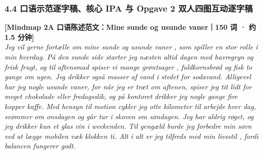 \subsubsection*{4.4 口语示范逐字稿、核心 IPA 与 Opgave 2 双人四图互动逐字稿}

\begin{transbox}
\small
\textbf{\color{NCDNavy}[Mindmap 2A 口语陈述范文：Mine sunde og usunde vaner｜150 词 · 约 1.5 分钟]}\\
\textit{Jeg vil gerne fortælle om mine sunde og usunde vaner , som spiller en stor rolle i min hverdag. På den sunde side starter jeg næsten altid dagen med havregryn  og frisk frugt, og til aftensmad spiser vi mange grøntsager , fuldkornsbrød og fisk to gange om ugen. Jeg drikker også masser af vand i stedet for sodavand. Alligevel har jeg nogle usunde vaner, for når jeg er træt om aftenen, spiser jeg tit lidt for meget chokolade  eller fredagsslik, og på kontoret drikker jeg nogle gange fire kopper kaffe. Med hensyn til motion  cykler jeg otte kilometer til arbejde hver dag, svømmer  om onsdagen og går tur i skoven om søndagen. Jeg har aldrig røget, og jeg drikker kun et glas vin i weekenden. Til gengæld burde jeg forbedre min søvn  ved at lægge mobilen væk klokken ti. Alt i alt er jeg tilfreds med min livsstil , fordi balancen fungerer godt.}
\end{transbox}

